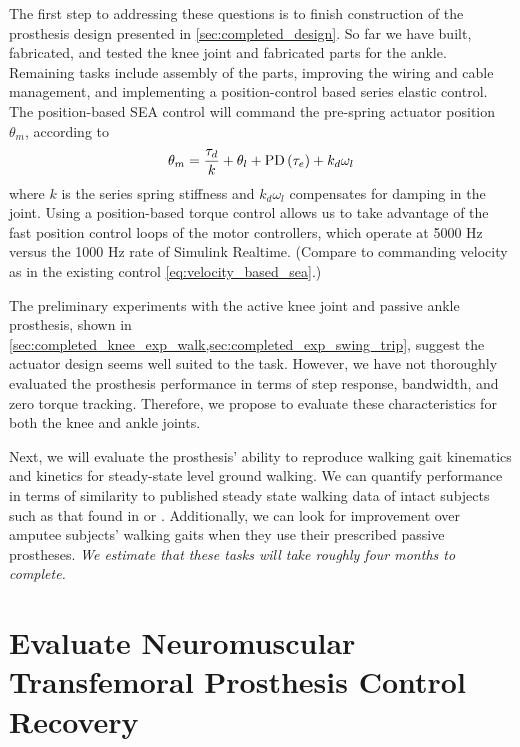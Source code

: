 The first step to addressing these questions is to finish construction of the
prosthesis design presented in \cref{sec:completed_design}. So far we have
built, fabricated, and tested the knee joint and fabricated parts for the ankle.
Remaining tasks include assembly of the parts, improving the wiring and cable
management, and implementing a position-control based series elastic control.
The position-based SEA control will command the pre-spring actuator position
$\theta_m$, according to
\begin{align}
    \theta_m = \frac{\tau_d}{k} + \theta_l + \func{PD}{\tau_e} + k_d \omega_l
\end{align}
where $k$ is the series spring stiffness and $k_d \omega_l$ compensates for
damping in the joint. Using a position-based torque control allows us to take
advantage of the fast position control loops of the motor controllers, 
which operate at 5000 Hz versus the 1000 Hz rate of Simulink Realtime. (Compare
to commanding velocity as in the existing control \cref{eq:velocity_based_sea}.)

The preliminary experiments with the active knee joint and passive ankle
prosthesis, shown in
\cref{sec:completed_knee_exp_walk,sec:completed_exp_swing_trip}, suggest the
actuator design seems well suited to the task. However, we have not thoroughly
evaluated the prosthesis performance in terms of step response, bandwidth, and
zero torque tracking. Therefore, we propose to evaluate these characteristics
for both the knee and ankle joints. 

Next, we will evaluate the prosthesis' ability to reproduce walking gait
kinematics and kinetics for steady-state level ground walking. We can quantify
performance in terms of similarity to published steady state walking data of
intact subjects such as that found in \citet{winter2009biomechanics} or
\citet{perry2010gait}. Additionally, we can look for improvement over amputee
subjects' walking gaits when they use their prescribed passive prostheses.
\emph{We estimate that these tasks will take roughly four months to complete.}

\section{Evaluate Neuromuscular Transfemoral Prosthesis
Control Recovery}\label{sec:proposed_evaluate}

